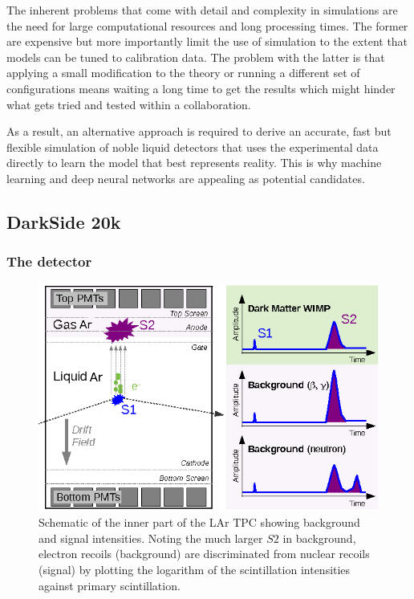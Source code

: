 \documentclass[11pt]{article} %
\begin{document}
The inherent problems that come with detail and complexity in simulations are the need for large computational resources and long processing times. The former are expensive but more importantly limit the use of simulation to the extent that models can be tuned to calibration data. The problem with the latter is that applying a small modification to the theory or running a different set of configurations means waiting a long time to get the results which might hinder what gets tried and tested within a collaboration.
\newline

As a result, an alternative approach is required to derive an accurate, fast but flexible simulation of noble liquid detectors that uses the experimental data directly to learn the model that best represents reality. This is why machine learning and deep neural networks are appealing as potential candidates.

\subsection{DarkSide 20k}
\subsubsection{The detector}
\begin{figure}[H]
\centering
\includegraphics[scale=0.7]{images/tpc1.png}
\caption{\cite{PhysRevLett.119.181301} Schematic of the inner part of the LAr TPC showing background and signal intensities. Noting the much larger $S2$ in background, electron recoils (background) are discriminated from nuclear recoils (signal) by plotting the logarithm of the scintillation intensities against primary scintillation.}
\label{fig:s1s2}
\end{figure}
\end{document}
